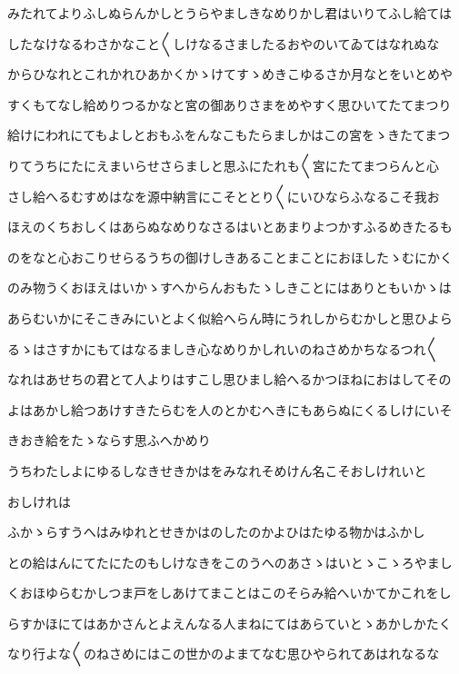 \documentclass[a4paper,11pt,landscape]{ltjtarticle}
\begin{document}
みたれてよりふしぬらんかしとうらやましきなめりかし君はいりてふし給ては
\par\medskip
したなけなるわさかなこと〱しけなるさましたるおやのいてゐてはなれぬな
\par\medskip
からひなれとこれかれひあかくかゝけてすゝめきこゆるさか月なとをいとめや
\par\medskip
すくもてなし給めりつるかなと宮の御ありさまをめやすく思ひいてたてまつり
\par\medskip
給けにわれにてもよしとおもふをんなこもたらましかはこの宮をゝきたてまつ
\par\medskip
りてうちにたにえまいらせさらましと思ふにたれも〱宮にたてまつらんと心
\par\medskip
さし給へるむすめはなを源中納言にこそととり〱にいひならふなるこそ我お
\par\medskip
ほえのくちおしくはあらぬなめりなさるはいとあまりよつかすふるめきたるも
\par\medskip
のをなと心おこりせらるうちの御けしきあることまことにおほしたゝむにかく
\par\medskip
のみ物うくおほえはいかゝすへからんおもたゝしきことにはありともいかゝは
\par\medskip
あらむいかにそこきみにいとよく似給へらん時にうれしからむかしと思ひよら
\par\medskip
るゝはさすかにもてはなるましき心なめりかしれいのねさめかちなるつれ〱
\par\medskip
なれはあせちの君とて人よりはすこし思ひまし給へるかつほねにおはしてその
\par\medskip
よはあかし給つあけすきたらむを人のとかむへきにもあらぬにくるしけにいそ
\par\medskip
きおき給をたゝならす思ふへかめり
\par\medskip
うちわたしよにゆるしなきせきかはをみなれそめけん名こそおしけれいと
\par\medskip
おしけれは
\par\medskip
ふかゝらすうへはみゆれとせきかはのしたのかよひはたゆる物かはふかし
\par\medskip
との給はんにてたにたのもしけなきをこのうへのあさゝはいとゝこゝろやまし
\par\medskip
くおほゆらむかしつま戸をしあけてまことはこのそらみ給へいかてかこれをし
\par\medskip
らすかほにてはあかさんとよえんなる人まねにてはあらていとゝあかしかたく
\par\medskip
なり行よな〱のねさめにはこの世かのよまてなむ思ひやられてあはれなるな
\par\medskip
\end{document}
